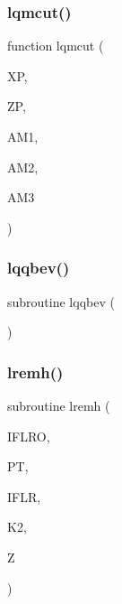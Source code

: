 \mbox{\label{djangoh__l_8f_a541c93d482139591c721854c34c5602b}} 
\subsubsection{\texorpdfstring{lqmcut()}{lqmcut()}}
{\footnotesize\ttfamily function lqmcut (\begin{DoxyParamCaption}\item[{}]{XP,  }\item[{}]{ZP,  }\item[{}]{A\+M1,  }\item[{}]{A\+M2,  }\item[{}]{A\+M3 }\end{DoxyParamCaption})}

\mbox{\label{djangoh__l_8f_a3e28d56ef10931205d7a8812c117d667}} 
\subsubsection{\texorpdfstring{lqqbev()}{lqqbev()}}
{\footnotesize\ttfamily subroutine lqqbev (\begin{DoxyParamCaption}{ }\end{DoxyParamCaption})}

\mbox{\label{djangoh__l_8f_a906c87082ea73a4b56c8e5ae5220dcce}} 
\subsubsection{\texorpdfstring{lremh()}{lremh()}}
{\footnotesize\ttfamily subroutine lremh (\begin{DoxyParamCaption}\item[{}]{I\+F\+L\+RO,  }\item[{}]{PT,  }\item[{}]{I\+F\+LR,  }\item[{}]{K2,  }\item[{}]{Z }\end{DoxyParamCaption})}

